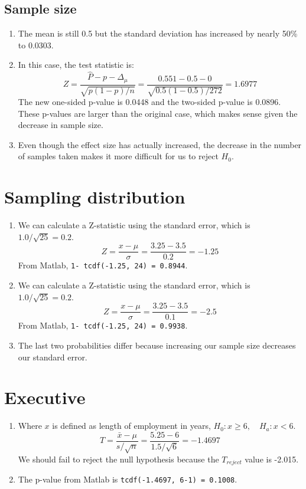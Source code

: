\documentclass{article}
\begin{document}
\subsection{Sample size}%
\label{sub:Sample size}
\begin{enumerate}[label=\alph*.]
    \item The mean is still 0.5 but the standard deviation has increased by nearly 50\% to 0.0303.
    \item  In this case, the test statistic is:
        $$Z = \frac{\hat{P} - p - \Delta_\mu}{\sqrt{p(1-p)/n}}=\frac{0.551 - 0.5 - 0}{\sqrt{0.5(1-0.5)/272}}=1.6977$$
        The new one-sided p-value is 0.0448 and the two-sided p-value is 0.0896. These p-values are larger than the original case, which makes sense given the decrease in sample size.
    \item Even though the effect size has actually increased, the decrease in the number of samples taken makes it more difficult for us to reject $H_0$.
\end{enumerate}

\section{Sampling distribution}%
\label{sec:Sampling distribution}
\begin{enumerate}[label=\alph*.]
    \item We can calculate a Z-statistic using the standard error, which is $1.0/\sqrt{25} = 0.2$.
        $$ Z = \frac{x - \mu}{\sigma} = \frac{3.25 - 3.5}{0.2}=-1.25$$
    From Matlab, \texttt{1- tcdf(-1.25, 24) = 0.8944}.
    \item We can calculate a Z-statistic using the standard error, which is $1.0/\sqrt{25} = 0.2$.
        $$ Z = \frac{x - \mu}{\sigma} = \frac{3.25 - 3.5}{0.1}= -2.5$$
    From Matlab, \texttt{1- tcdf(-1.25, 24) = 0.9938}.
    \item The last two probabilities differ because increasing our sample size decreases our standard error.
\end{enumerate}


\section{Executive}%
\label{sec:Executive}
\begin{enumerate}[label=\alph*.]
    \item Where $x$ is defined as length of employment in years, $H_0: x \geq 6, \quad H_a: x < 6$.  
        $$ T = \frac{\bar{x} - \mu}{s/\sqrt{n}} = \frac{5.25-6}{1.5/\sqrt{6}}=-1.4697$$
    We should fail to reject the null hypothesis because the $T_{reject}$ value is -2.015.
\item The p-value from Matlab is \texttt{tcdf(-1.4697, 6-1) = 0.1008}. 
\end{enumerate}
\end{document}
